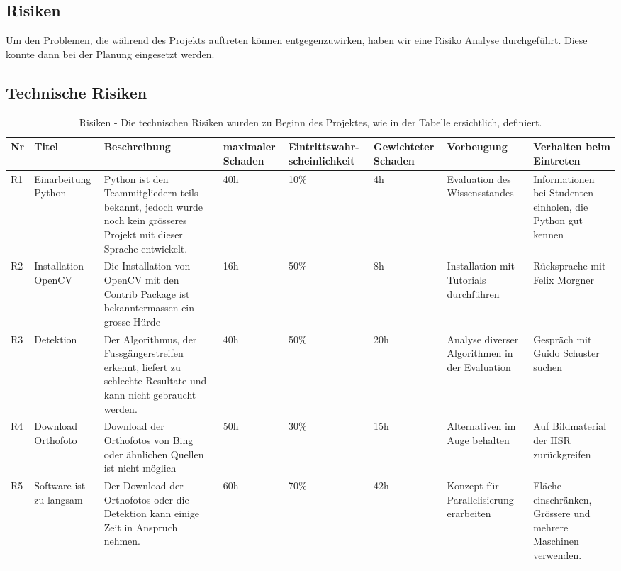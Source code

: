 \begin{landscape}
\section{Risiken}
Um den Problemen, die während des Projekts auftreten können entgegenzuwirken, haben wir eine Risiko Analyse durchgeführt. Diese konnte dann bei der Planung eingesetzt werden.

\subsection{Technische Risiken}
\begin{table}[H]
    \begin{tabular}{|p{0.4cm}|p{1.8cm}|p{7cm}|p{1.5cm}|p{2.25cm}|p{1.75cm}|p{3cm}|p{4cm}|}
    \hline    
    \rowcolor{lightblue}
    Nr & Titel & Beschreibung & maximaler Schaden & Eintrittswahr-scheinlichkeit & Gewichteter Schaden & Vorbeugung & Verhalten beim Eintreten \\ \hline
	R1 & Einarbeitung Python & Python ist den Teammitgliedern teils bekannt, jedoch wurde noch kein grösseres Projekt mit dieser Sprache entwickelt. & 40h & 10\% &4h & Evaluation des Wissensstandes & Informationen bei Studenten einholen, die Python gut kennen \\ \hline
	R2 & Installation OpenCV & Die Installation von OpenCV mit den Contrib Package ist bekanntermassen ein grosse Hürde & 16h & 50\% & 8h & Installation mit Tutorials durchführen & Rücksprache mit Felix Morgner \\ \hline
	R3 & Detektion & Der Algorithmus, der Fussgängerstreifen erkennt, liefert zu schlechte Resultate und kann nicht gebraucht werden. & 40h & 50\% & 20h & Analyse diverser Algorithmen in der Evaluation & Gespräch mit Guido Schuster suchen \\ \hline
	R4 & Download Orthofoto & Download der Orthofotos von Bing oder ähnlichen Quellen ist nicht möglich & 50h & 30\% & 15h & Alternativen im Auge behalten & Auf Bildmaterial der HSR zurückgreifen \\ \hline
	R5 & Software ist zu langsam & Der Download der Orthofotos oder die Detektion kann einige Zeit in Anspruch nehmen.	& 60h & 70\% & 42h & Konzept für Parallelisierung erarbeiten & Fläche einschränken, - Grössere und mehrere Maschinen verwenden. \\ \hline
    \end{tabular}
    \caption[Risiken]{Risiken - Die technischen Risiken wurden zu Beginn des Projektes, wie in der Tabelle ersichtlich, definiert.}
\end{table}
\end{landscape}

